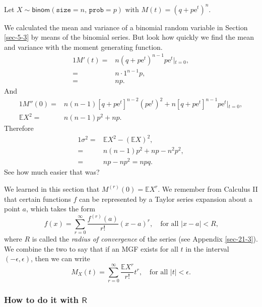 \documentclass[captions=tableheading]{scrbook}
\begin{document}
\begin{example}
Let \(X\sim\mathsf{binom}(\mathtt{size}=n,\,\mathtt{prob}=p)\mbox{ with $M(t)=(q+p\mathrm{e}^{t})^{n}$}\).

We calculated the mean and variance of a binomial random variable in Section \ref{sec-5-3} by means of the binomial series. But look how quickly we find the mean and variance with the moment generating function.
\begin{alignat*}{1}
M'(t)= & n(q+p\mathrm{e}^{t})^{n-1}p\mathrm{e}^{t}\left|_{t=0}\right.,\\
= & n\cdot1^{n-1}p,\\
= & np.
\end{alignat*}
And
\begin{alignat*}{1}
M''(0)= & n(n-1)[q+p\mathrm{e}^{t}]^{n-2}(p\mathrm{e}^{t})^{2}+n[q+p\mathrm{e}^{t}]^{n-1}p\mathrm{e}^{t}\left|_{t=0}\right.,\\
\mathbb{E} X^{2}= & n(n-1)p^{2}+np.
\end{alignat*}
Therefore
\begin{alignat*}{1}
\sigma^{2}= & \mathbb{E} X^{2}-(\mathbb{E} X)^{2},\\
= & n(n-1)p^{2}+np-n^{2}p^{2},\\
= & np-np^{2}=npq.
\end{alignat*}
See how much easier that was?
\end{example}

\begin{rem}
We learned in this section that \(M^{(r)}(0)=\mathbb{E} X^{r}\). We remember from Calculus II that certain functions \(f\) can be represented by a Taylor series expansion about a point \(a\), which takes the form
\begin{equation}
f(x)=\sum_{r=0}^{\infty}\frac{f^{(r)}(a)}{r!}(x-a)^{r},\quad \mbox{for all \(|x-a| < R\),}
\end{equation}
where \(R\) is called the \emph{radius of convergence} of the series (see Appendix \ref{sec-21-3}). We combine the two to say that if an MGF exists for all \(t\) in the interval \((-\epsilon,\epsilon)\), then we can write
\begin{equation}
M_{X}(t)=\sum_{r=0}^{\infty}\frac{\mathbb{E} X^{r}}{r!}t^{r},\quad \mbox{for all $|t|<\epsilon$.}
\end{equation}
\end{rem}
\subsubsection{How to do it with \(\mathsf{R}\)}
\label{sec-5-4-2-3}
\end{document}

